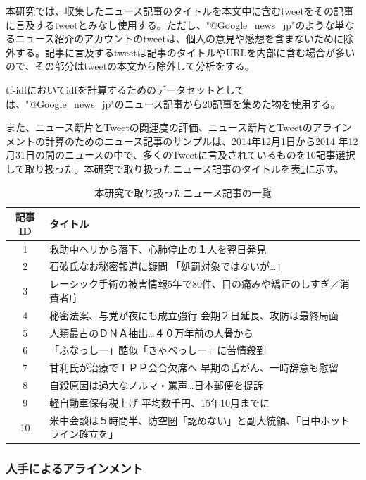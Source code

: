 \documentclass[12pt]{jarticle}
\begin{document}
本研究では、収集したニュース記事のタイトルを本文中に含むtweetをその記事に言及するtweetとみなし使用する。ただし、"@Google\_news\_jp"のような単なるニュース紹介のアカウントのtweetは、個人の意見や感想を含まないために除外する。記事に言及するtweetは記事のタイトルやURLを内部に含む場合が多いので、その部分はtweetの本文から除外して分析をする。

tf-idfにおいてidfを計算するためのデータセットとしては、"@Google\_news\_jp"のニュース記事から20記事を集めた物を使用する。

また、ニュース断片とTweetの関連度の評価、ニュース断片とTweetのアラインメントの計算のためのニュース記事のサンプルは、2014年12月1日から2014
年12月31日の間のニュースの中で、多くのTweetに言及されているものを10記事選択して取り扱った。本研究で取り扱ったニュース記事のタイトルを表\ref{news_table}に示す。

\begin{table}
\begin{center}
\caption{本研究で取り扱ったニュース記事の一覧}
\label{news_table}
\begin{tabular}[t]{|c||l|}
  \hline
  記事ID & タイトル \\
  \hline
  \hline
1 & 救助中ヘリから落下、心肺停止の１人を翌日発見 \\ \hline
2 & 石破氏なお秘密報道に疑問 「処罰対象ではないが…」 \\ \hline
3 & レーシック手術の被害情報5年で80件、目の痛みや矯正のしすぎ／消費者庁 \\ \hline
4 & 秘密法案、与党が夜にも成立強行 会期２日延長、攻防は最終局面 \\ \hline
5 & 人類最古のＤＮＡ抽出…４０万年前の人骨から \\ \hline
6 & 「ふなっしー」酷似「きゃべっしー」に苦情殺到 \\ \hline
7 & 甘利氏が治療でＴＰＰ会合欠席へ 早期の舌がん、一時辞意も慰留 \\ \hline
8 & 自殺原因は過大なノルマ・罵声…日本郵便を提訴 \\ \hline
9 & 軽自動車保有税上げ 平均数千円、15年10月までに \\ \hline
10 & 米中会談は５時間半、防空圏「認めない」と副大統領、「日中ホットライン確立を」 \\ \hline
\end{tabular}
\end{center}
\end{table}

\subsubsection{人手によるアラインメント}
\label{align_by_human}
\end{document}
